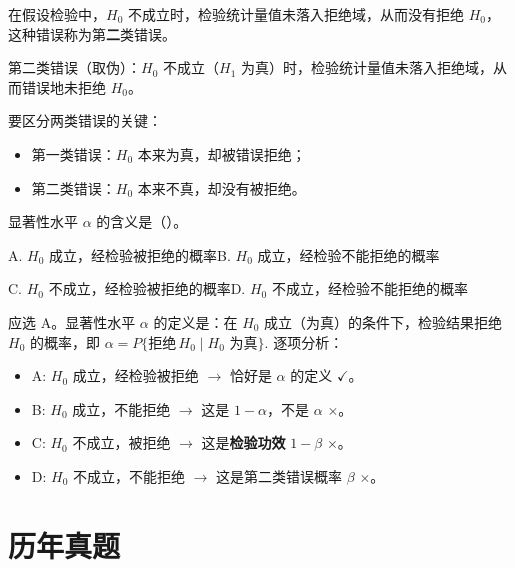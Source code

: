 \documentclass[lang=cn,11pt]{elegantbook}
\begin{document}
\begin{exercise}\label{exer:9-error-concept1}
在假设检验中，\(H_0\) 不成立时，检验统计量值未落入拒绝域，从而没有拒绝 \(H_0\)，这种错误称为第\textbf{二}类错误。
\end{exercise}
\begin{solution}
第二类错误（取伪）：\(H_0\) 不成立（\(H_1\) 为真）时，检验统计量值未落入拒绝域，从而错误地未拒绝 \(H_0\)。
\begin{note}
要区分两类错误的关键：
\begin{itemize}
    \item 第一类错误：\(H_0\) 本来为真，却被错误拒绝；
    \item 第二类错误：\(H_0\) 本来不真，却没有被拒绝。
\end{itemize}
\end{note}
\end{solution}


\begin{exercise}\label{exer:9-error-concept2}
显著性水平 \(\alpha\) 的含义是（\quad）。\par
A. \(H_0\) 成立，经检验被拒绝的概率\qquad B. \(H_0\) 成立，经检验不能拒绝的概率\par
C. \(H_0\) 不成立，经检验被拒绝的概率\qquad D. \(H_0\) 不成立，经检验不能拒绝的概率
\end{exercise}
\begin{solution}
应选 A。显著性水平 \(\alpha\) 的定义是：在 \(H_0\) 成立（为真）的条件下，检验结果拒绝 \(H_0\) 的概率，即
\(
\alpha = P\{\text{拒绝}\,H_0 \mid H_0\text{ 为真}\}.
\)
逐项分析：
\begin{itemize}
    \item A: \(H_0\) 成立，经检验被拒绝 \(\longrightarrow\) 恰好是 \(\alpha\) 的定义 \(\checkmark\)。
    \item B: \(H_0\) 成立，不能拒绝 \(\longrightarrow\) 这是 \(1-\alpha\)，不是 \(\alpha\) \(\times\)。
    \item C: \(H_0\) 不成立，被拒绝 \(\longrightarrow\) 这是\textbf{检验功效} \(1-\beta\) \(\times\)。
    \item D: \(H_0\) 不成立，不能拒绝 \(\longrightarrow\) 这是第二类错误概率 \(\beta\) \(\times\)。
\end{itemize}
\end{solution}

\chapter{历年真题}
\end{document}
